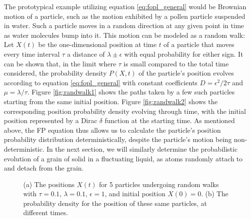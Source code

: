 The prototypical example utilizing equation \ref{eq:fopl_general} would be Brownian motion of a particle, such as the motion exhibited by a pollen particle suspended in water. Such a particle moves in a random direction at any given point in time as water molecules bump into it. This motion can be modeled as a random walk: Let $X(t)$ be the one-dimensional position at time $t$ of a particle that moves every time interval $\tau$ a distance of $\lambda \pm \epsilon$ with equal probability for either sign. It can be shown \cite{gardiner_stochastic} that, in the limit where $\tau$ is small compared to the total time considered, the probability density $P(X,t)$ of the particle's position evolves according to equation \ref{eq:fopl_general} with constant coefficients $D=\epsilon^2/2\tau$ and $\mu=\lambda/\tau$. Figure \ref{fig:randwalk1} shows the paths taken by a few such particles starting from the same initial position. Figure \ref{fig:randwalk2} shows the corresponding position probability density evolving through time, with the initial position represented by a Dirac $\delta$ function at the starting time. As mentioned above, the FP equation thus allows us to calculate the particle's position probability distribution deterministically, despite the particle's motion being non-deterministic. In the next section, we will similarly determine the probabilistic evolution of a grain of solid in a fluctuating liquid, as atoms randomly attach to and detach from the grain.

\begin{figure}[h]
    \centering
{}
\caption{(a) The positions $X(t)$ for 5 particles undergoing random walks with $\tau=0.1$, $\lambda=0.1$, $\epsilon=1$, and initial position $X(0)=0$. (b) The probability density for the position of these same particles, at different times.}
\end{figure}

